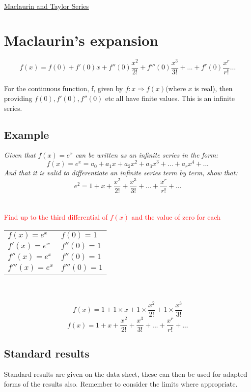 \documentclass{article}[18pt]
\begin{document}
\begin{center}
\underline{\huge Maclaurin and Taylor Series}
\end{center}
\section{Maclaurin's expansion}
$$f(x)=f(0)+f'(0)x+f''(0)\frac{x^2}{2!}+f'''(0)\frac{x^3}{3!}+...+f^r(0)\frac{x^r}{r!}...$$
\\
For the continuous function, f, given by $f:x\Rightarrow f(x)$(where $x$ is real), then providing $f(0),f'(0),f''(0)$ etc all have finite values. This is an infinite series.
\subsection{Example}
\textit{Given that $f(x)=e^x$ can be written as an infinite series in the form:}
$$f(x)=e^x=a_0+a_1x+a_2x^2+a_3x^3+...+a_rx^4+...$$
\textit{And that it is valid to differentiate an infinite series term by term, show that:}
$$e^2=1+x+\frac{x^2}{2!}+\frac{x^3}{3!}+...+\frac{x^r}{r!}+...$$
\\
\\
\textcolor{red}{Find up to the third differential of $f(x)$ and the value of zero for each}\\
\begin{tabular}{l l}
$f(x)=e^x$&$f(0)=1$\\
$f'(x)=e^x$&$f''(0)=1$\\
$f''(x)=e^x$&$f''(0)=1$\\
$f'''(x)=e^x$&$f'''(0)=1$
\end{tabular}
\\
\\
$$f(x)=1+1\times x+1\times\frac{x^2}{2!}+1\times\frac{x^3}{3!}$$
$$f(x)=1+x+\frac{x^2}{2!}+\frac{x^3}{3!}+...+\frac{x^r}{r!}+...$$
\subsection{Standard results}
Standard results are given on the data sheet, these can then be used for adapted forms of the results also. Remember to consider the limits where appropriate.
\newpage
\end{document}
